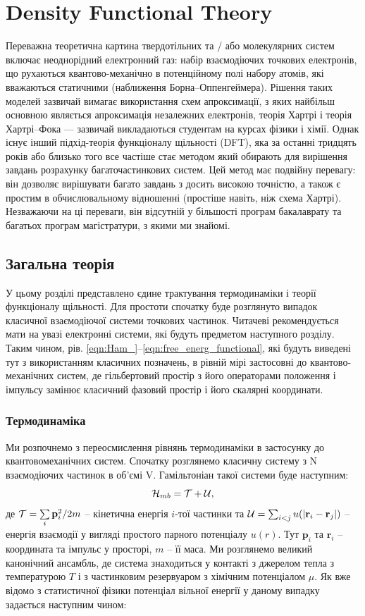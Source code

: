 \chapter{Density Functional Theory}
Переважна теоретична картина твердотільних та / або молекулярних систем включає неоднорідний електронний газ: набір взаємодіючих точкових електронів, що рухаються квантово-механічно в потенційному полі набору атомів, які вважаються статичними (наближення Борна–Оппенгеймера). Рішення таких моделей зазвичай вимагає використання схем апроксимації, з яких найбільш основною являється апроксимація незалежних електронів, теорія Хартрі і теорія Хартрі–Фока — зазвичай викладаються студентам на курсах фізики і хімії. Однак існує інший підхід-теорія функціоналу щільності (DFT), яка за останні тридцять років або близько того все частіше стає методом який обирають для вирішення завдань розрахунку багаточастинкових систем. Цей метод має подвійну перевагу: він дозволяє вирішувати багато завдань з досить високою точністю, а також є простим в обчислювальному відношенні (простіше навіть, ніж схема Хартрі). Незважаючи на ці переваги, він відсутній у більшості програм бакалаврату та багатьох програм магістратури, з якими ми знайомі.
\section{Загальна теорія}
У цьому розділі представлено єдине трактування термодинаміки і теорії функціоналу щільності. Для простоти спочатку буде розглянуто випадок класичної взаємодіючої системи точкових частинок. Читачеві рекомендується мати на увазі електронні системи, які будуть предметом наступного розділу. Таким чином, рів. \ref{eqn:Ham_}--\ref{eqn:free_energ_functional}, які будуть виведені тут з використанням класичних позначень, в рівній мірі застосовні до квантово-механічних систем, де гільбертовий простір з його операторами положення і імпульсу замінює класичний фазовий простір і його скалярні координати.
\subsection{Термодинаміка}
Ми розпочнемо з переосмислення рівнянь термодинаміки в застосунку до квантовомеханічних систем. Спочатку розглянемо класичну систему з N взаємодіючих частинок в об'ємі V. Гамільтоніан такої системи буде наступним:
\begin{equation}
\label{eqn:Ham_}
	{\cal H}_{mb} = {\cal T} + {\cal U},
\end{equation}
де ${\cal T} = \sum\limits_{i}\textbf{p}_i^2/2m$ -- кінетична енергія $i$-тої частинки та ${\cal U} = \sum_{i < j}u(|\textbf{r}_i - \textbf{r}_j|)$ -- енергія взаємодії у вигляді простого парного потенціалу $u(r)$. Тут $\textbf{p}_i$ та $\textbf{r}_i$ -- координата та імпульс у просторі, $m$ -- її маса. 
Ми розглянемо великий канонічний ансамбль, де система знаходиться у контакті з джерелом тепла з температурою $T$ і з частинковим резервуаром з хімічним потенціалом $\mu$. Як вже відомо з статистичної фізики потенціал вільної енергії у даному випадку задається наступним чином:

